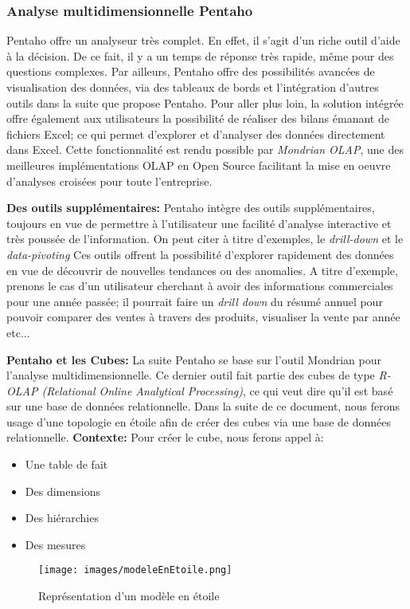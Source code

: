\documentclass[12pt,a4wide,twoside]{report}
\begin{document}
\subsubsection{Analyse multidimensionnelle Pentaho}
Pentaho offre un analyseur très complet. En effet, il s'agit d'un riche outil d'aide à la décision. De ce fait, il y a un temps de réponse très rapide, même pour des questions complexes.\newline
Par ailleurs, Pentaho offre des possibilités avancées de visualisation des données, via des tableaux de bords et l'intégration d'autres outils dans la suite que propose Pentaho. Pour aller plus loin, la solution intégrée offre également aux utilisateurs la possibilité de réaliser des bilans émanant de fichiers Excel; ce qui permet d'explorer et d'analyser des données directement dans Excel. Cette fonctionnalité est rendu possible par \emph{Mondrian OLAP}, une des meilleures implémentations OLAP en Open Source facilitant la mise en oeuvre d'analyses croisées pour toute l'entreprise. \cite{misc8}


\textbf{Des outils supplémentaires:}\newline
Pentaho intègre des outils supplémentaires, toujours en vue de permettre à l'utilisateur une facilité d'analyse interactive et très poussée de l'information. On peut citer à titre d'exemples, le \emph{drill-down} et le \emph{data-pivoting}\newline
Ces outils offrent la possibilité d'explorer rapidement des données en vue de découvrir de nouvelles tendances ou des anomalies. A titre d'exemple, prenons le cas d'un utilisateur cherchant à avoir des informations commerciales pour une année passée; il pourrait faire un \emph{drill down} du résumé annuel pour pouvoir comparer des ventes à travers des produits, visualiser la vente par année etc...


\textbf{Pentaho et les Cubes:}\newline
La suite Pentaho se base sur l'outil Mondrian pour l'analyse multidimensionnelle. Ce dernier outil fait partie des cubes de type \emph{R-OLAP (Relational Online Analytical Processing)}, ce qui veut dire qu'il est basé sur une base de données relationnelle.\newline
Dans la suite de ce document, nous ferons usage d'une topologie en étoile afin de créer des cubes via une base de données relationnelle.\newline
\textbf{Contexte:} Pour créer le cube, nous ferons appel à:
\begin{itemize}
	\item Une table de fait 
	\item Des dimensions
	\item Des hiérarchies
	\item Des mesures 
\end{itemize} \newpage
\begin{figure}[!h]
\begin{center}
			\texttt{[image: images/modeleEnEtoile.png]}
\end{center}
\caption{Représentation d'un modèle en étoile}
\end{figure}
\end{document}
